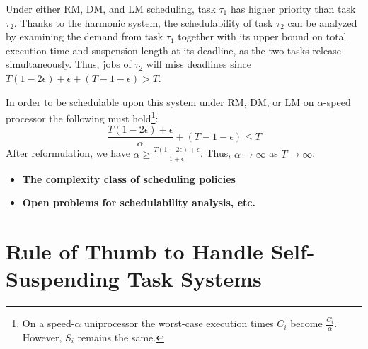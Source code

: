 Under either RM, DM, and LM scheduling, task $\tau_1$ has higher priority than task $\tau_2$. 
Thanks to the harmonic system, the schedulability of task $\tau_2$ can be analyzed by examining the demand from task $\tau_1$ together with its upper bound on total execution time and suspension length at its deadline, as the two tasks release simultaneously.
Thus, jobs of $\tau_2$ will miss deadlines since $T( 1-2\epsilon)+\epsilon+(T-1-\epsilon) > T$.

In order to be schedulable upon this system under RM, DM, or LM on $\alpha$-speed processor the following must hold\footnote{On a speed-$\alpha$ uniprocessor the worst-case execution times $C_{i}$ become $\frac{C_{i}}{\alpha}$. However, $S_i$ remains the same.}:
\begin{equation*}
\frac{T( 1-2\epsilon)+\epsilon}{\alpha}+(T-1-\epsilon) \le T
\end{equation*}
After reformulation, we have $\alpha\ge \frac{T( 1-2\epsilon)+\epsilon}{1+\epsilon}$. Thus, $\alpha\rightarrow \infty$ as $T \rightarrow \infty$.


   
\begin{itemize}
\item \textbf{The complexity class of scheduling policies}
\item \textbf{Open problems for schedulability analysis, etc.}
\end{itemize}
  
\section{Rule of Thumb to Handle Self-Suspending Task Systems}